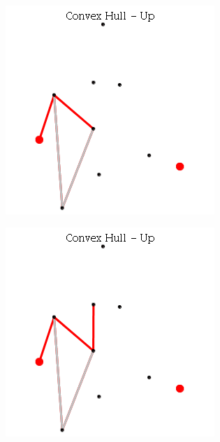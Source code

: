 \documentclass[12pt]{article}
\begin{document}
\begin{figure}[h]
\begin{subfigure}[h]{0.275\linewidth}
              \caption{}
            \end{subfigure}
            \begin{subfigure}[h]{0.275\linewidth}
              \includegraphics[width=\linewidth]{GIF/Up-6}
              \caption{}
            \end{subfigure}
            \begin{subfigure}[h]{0.275\linewidth}
              \includegraphics[width=\linewidth]{GIF/Up-7}

\end{subfigure}
\end{figure}
\end{document}
